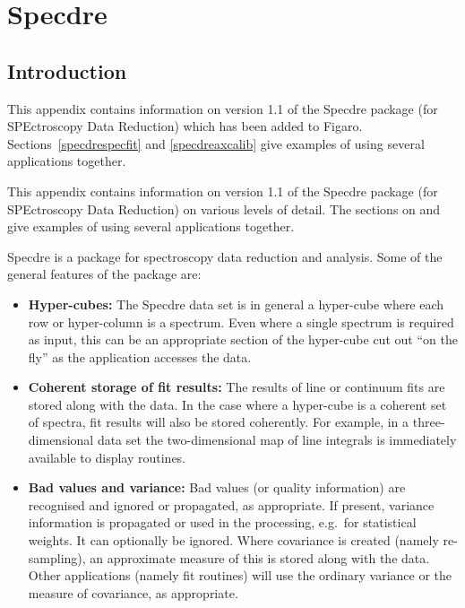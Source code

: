 
\newpage %
\section{\label{specdre}Specdre}

\subsection{\label{specdreintro}Introduction}

\begin{latexonly}
   This appendix contains information on version 1.1 of the Specdre
   package (for SPEctroscopy Data Reduction) which has been added to Figaro.
   Sections~\ref{specdrespecfit} and \ref{specdreaxcalib}
   give examples of using several applications together.
\end{latexonly}

\begin{htmlonly}
   This appendix contains information on version 1.1 of the Specdre
   package (for SPEctroscopy Data Reduction) on various levels of
   detail. The sections on
   and
   give examples of using several applications together.
\end{htmlonly}

   Specdre is a package for spectroscopy data reduction and analysis.
   Some of the general features of the package are:

\begin{itemize}
\item {\bf Hyper-cubes:} The Specdre data set is in general a hyper-cube
   where each row or hyper-column is a spectrum. Even where a single
   spectrum is required as input, this can be an appropriate section of
   the hyper-cube cut out ``on the fly'' as the application accesses the
   data.
\item {\bf Coherent storage of fit results:} The results of line or
   continuum fits are stored along with the data. In the case where a
   hyper-cube is a coherent set of spectra, fit results will also be
   stored coherently. For example, in a three-dimensional data set the
   two-dimensional map of line integrals is immediately available to
   display routines.
\item {\bf Bad values and variance:} Bad values (or quality information)
   are recognised and ignored or propagated, as appropriate. If present,
   variance information is propagated or used in the processing,
   e.g.\ for statistical weights. It can optionally be ignored. Where
   covariance is created (namely re-sampling), an approximate measure of
   this is stored along with the data. Other applications (namely fit
   routines) will use the ordinary variance or the measure of
   covariance, as appropriate.
\end{itemize}

